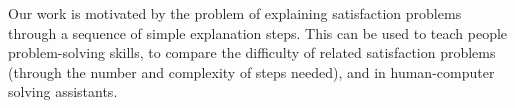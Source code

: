 Our work is motivated by the problem of explaining satisfaction problems through a sequence of simple explanation steps. This can be used to teach people problem-solving skills, to compare the difficulty of related satisfaction problems (through the number and complexity of steps needed), and in human-computer solving assistants.

%
%
%
%
